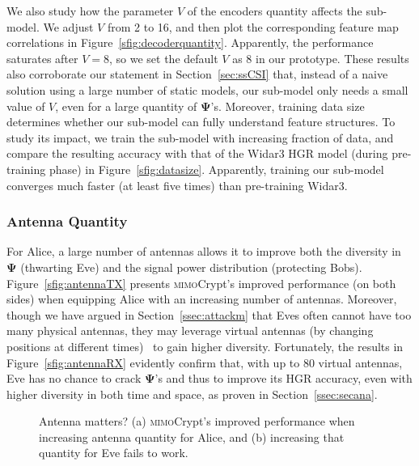 \documentclass[conference,compsoc]{IEEEtran}
\newcommand{\sname}{\textsc{mimo}Crypt\xspace}
\newcommand{\newrev}[1]{{\color{blue}#1}}    %
\newcommand{\newrev}[1]{#1}
\begin{document}
%
We also study how the parameter $V$ of the encoders quantity affects the sub-model. We adjust $V$ from 2 to 16, and then plot the corresponding feature map correlations in Figure~\ref{sfig:decoderquantity}. Apparently, the performance saturates after $V = 8$, so we set the default $V$ as 8 in our prototype. These results also corroborate our statement in Section~\ref{sec:ssCSI} that, instead of a naive solution using a large number of static models, our sub-model only needs a small value of $V$, even for a large quantity of $\bm{\Psi}$'s. Moreover, training data size determines whether our sub-model can fully understand feature structures. To study its impact, we train the sub-model with increasing fraction of data, and compare the resulting accuracy with that of the Widar3 HGR model (during pre-training phase) in Figure~\ref{sfig:datasize}. Apparently, training our sub-model converges much faster (at least five times) than pre-training Widar3.



\subsubsection{Antenna Quantity}\label{sssec:antqua}
%
For Alice, a large number of antennas allows it to improve both the diversity in $\bm{\Psi}$ (thwarting Eve) and the signal power distribution (protecting Bobs). Figure~\ref{sfig:antennaTX} presents \sname's improved performance (on both sides) when equipping Alice with an increasing number of antennas. Moreover, though we have argued in Section~\ref{ssec:attackm} that Eves often cannot have too many physical antennas, \newrev{they may leverage virtual antennas (by changing positions at different times)~\cite{Virtual_Ant1} to gain higher diversity.} Fortunately, the results in Figure~\ref{sfig:antennaRX} evidently confirm that, with up to 80 virtual antennas, Eve has no chance to crack $\bm{\Psi}$'s and thus to improve its HGR accuracy, \newrev{even with higher diversity in both time and space, as proven in Section~\ref{ssec:secana}.}


\begin{figure}[t]
	\setlength\abovecaptionskip{8pt}
	\vspace{-1.5ex}
	\centering
	\caption{Antenna matters? (a) \sname's improved performance when increasing antenna quantity for Alice, and (b) increasing that quantity for Eve fails to work.}
	\label{fig:antenna}
	\vspace{-1ex}
\end{figure}
\end{document}
